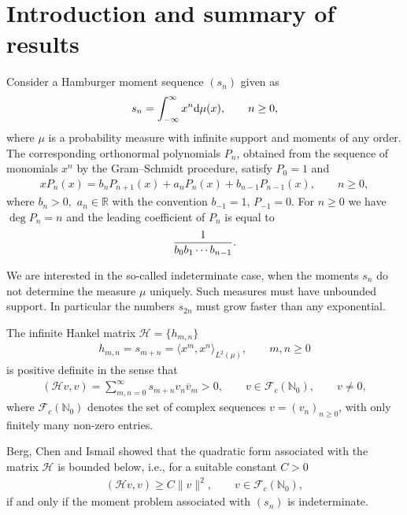 \documentclass[pdftex]{sigma}
\numberwithin{equation}{section}
\begin{document}

\renewcommand{\thefootnote}{\arabic{footnote}}
\setcounter{footnote}{0}

\section{Introduction and summary of results}
Consider a Hamburger moment sequence $(s_n)$ given as
\begin{gather*}
s_n=\int_{-\infty}^\infty x^n{\rm d}\mu(x), \qquad n\ge 0,
\end{gather*}
 where $\mu$ is a probability measure with infinite support and moments of any order. The corresponding orthonormal polynomials $P_n$, obtained from the sequence of monomials $x^n$ by the Gram--Schmidt procedure, satisfy $P_0=1$ and
\begin{gather}\label{eq:rec}
xP_n(x)=b_nP_{n+1}(x)+a_nP_n(x)+b_{n-1}P_{n-1}(x),\qquad n\ge 0,
\end{gather}
where $b_n>0, $ $a_n\in\mathbb{R}$ with the convention $b_{-1}=1$, $P_{-1}=0$. For $n\ge 0$ we have $\deg P_n=n$ and the leading coefficient of $P_n$ is equal to
\begin{gather}\label{eq:lead}
{1\over b_0b_1\cdots b_{n-1}}.
\end{gather}

We are interested in the so-called indeterminate case, when the moments $s_n$ do not determine the measure $\mu$ uniquely. Such measures must have unbounded support. In particular the numbers $s_{2n}$ must grow faster than any exponential.

The infinite Hankel matrix $\mathcal H=\{h_{m,n}\}$
 \begin{gather*}
h_{m,n}=s_{m+n}=\big\langle x^m,x^n\big\rangle_{L^2(\mu)},\qquad m,n\ge 0
\end{gather*}
is positive definite in the sense that
\begin{gather}\label{eq:Hank}
(\mathcal Hv,v)=\sum_{m,n=0}^\infty s_{m+n}v_n\overline{v}_m>0,\qquad v\in \mathcal{F}_c(\mathbb{N}_0), \qquad v\neq 0,
\end{gather}
where $\mathcal{F}_c(\mathbb{N}_0)$ denotes the set of complex sequences $v=(v_n)_{n\ge 0}$, with only finitely many non-zero entries.

Berg, Chen and Ismail \cite{B:C:I} showed that the quadratic form associated with the matrix $\mathcal H$ is bounded below, i.e., for a suitable constant $C>0$
\begin{gather*}
(\mathcal{H}v,v)\ge C\|v\|^2,\qquad v\in \mathcal{F}_c(\mathbb{N}_0),
\end{gather*}
if and only if the moment problem associated with $(s_n)$ is indeterminate.
\end{document}
